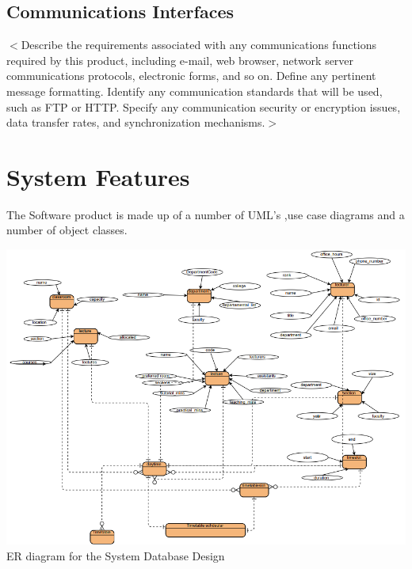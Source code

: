 \documentclass{scrreprt}
\begin{document}
\section{Communications Interfaces}
$<$Describe the requirements associated with any communications functions 
required by this product, including e-mail, web browser, network server 
communications protocols, electronic forms, and so on. Define any pertinent 
message formatting. Identify any communication standards that will be used, such 
as FTP or HTTP. Specify any communication security or encryption issues, data 
transfer rates, and synchronization mechanisms.$>$


\chapter{System Features}
The Software product is made up of a number of UML's ,use case diagrams and a number of object classes.
\begin{center}
\includegraphics[scale=0.6]{er.png}
ER diagram for the System Database Design
\end{center}
\end{document}
